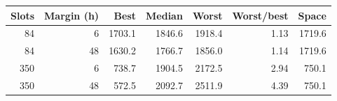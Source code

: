 \begin{tabular}{rrrrrrr}
\toprule
Slots & Margin (h) & Best & Median & Worst & Worst/best & Space \\
\midrule
84 & 6 & 1703.1 & 1846.6 & 1918.4 & 1.13 & 1719.6 \\
84 & 48 & 1630.2 & 1766.7 & 1856.0 & 1.14 & 1719.6 \\
350 & 6 & 738.7 & 1904.5 & 2172.5 & 2.94 & 750.1 \\
350 & 48 & 572.5 & 2092.7 & 2511.9 & 4.39 & 750.1 \\
\bottomrule
\end{tabular}
